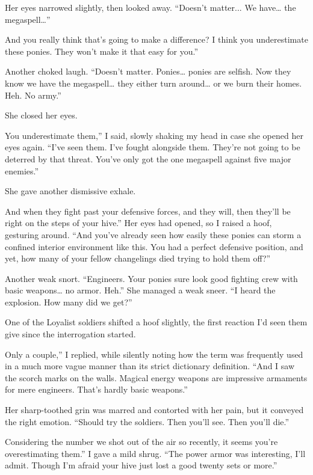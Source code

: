 Her eyes narrowed slightly, then looked away. “Doesn’t matter... We have… the megaspell…”

\leavevmode{}And you really think that’s going to make a difference? I think you underestimate these ponies. They won’t make it that easy for you.”

Another choked laugh. “Doesn’t matter. Ponies… ponies are selfish. Now they know we have the megaspell… they either turn around… or we burn their homes. Heh. No army.”

She closed her eyes.

\leavevmode{}You underestimate them,” I said, slowly shaking my head in case she opened her eyes again. “I’ve seen them. I’ve fought alongside them. They’re not going to be deterred by that threat. You’ve only got the one megaspell against five major enemies.”

She gave another dismissive exhale.

\leavevmode{}And when they fight past your defensive forces, and they will, then they’ll be right on the steps of your hive.” Her eyes had opened, so I raised a hoof, gesturing around. “And you’ve already seen how easily these ponies can storm a confined interior environment like this. You had a perfect defensive position, and yet, how many of your fellow changelings died trying to hold them off?”

Another weak snort. “Engineers. Your ponies sure look good fighting crew with basic weapons… no armor. Heh.” She managed a weak sneer. “I heard the explosion. How many did we get?”

One of the Loyalist soldiers shifted a hoof slightly, the first reaction I’d seen them give since the interrogation started.

\leavevmode{}Only a couple,” I replied, while silently noting how the term was frequently used in a much more vague manner than its strict dictionary definition. “And I saw the scorch marks on the walls. Magical energy weapons are impressive armaments for mere engineers. That’s hardly basic weapons.”

Her sharp-toothed grin was marred and contorted with her pain, but it conveyed the right emotion. “Should try the soldiers. Then you’ll see. Then you’ll die.”

\leavevmode{}Considering the number we shot out of the air so recently, it seems you’re overestimating them.” I gave a mild shrug. “The power armor was interesting, I’ll admit. Though I’m afraid your hive just lost a good twenty sets or more.”

